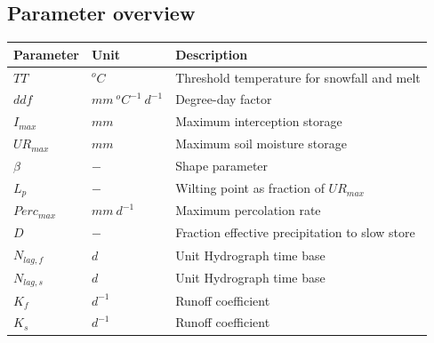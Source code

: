 \subsection{Parameter overview}
\begin{table}[htbp]
  \centering
    \begin{tabular}{lll}
    \toprule
    Parameter & Unit  & Description \\
    \midrule
    $TT$  & $^oC$ & Threshold temperature for snowfall and melt \\
    $ddf$ & $mm~^oC^{-1}~d^{-1}$ & Degree-day factor \\
    $I_{max}$ & $mm$  & Maximum interception storage \\
    $UR_{max}$ & $mm$  & Maximum soil moisture storage \\
    $\beta$ & $-$   & Shape parameter \\
    $L_p$ & $-$   & Wilting point as fraction of $UR_{max}$ \\
    $Perc_{max}$ & $mm~d^{-1}$ & Maximum percolation rate \\
    $D$   & $-$   & Fraction effective precipitation to slow store \\
    $N_{lag,f}$ & $d$   & Unit Hydrograph time base \\
    $N_{lag,s}$ & $d$   & Unit Hydrograph time base \\
    $K_f$ & $d^{-1}$ & Runoff coefficient \\
    $K_s$ & $d^{-1}$ & Runoff coefficient \\
    \bottomrule
    \end{tabular}%
  \label{tab:addlabel}%
\end{table}%

